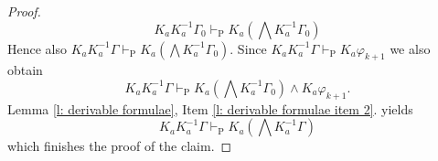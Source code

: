 \documentclass[10pt,a4paper]{amsart}
\newcommand{\K}{K}
\newcommand{\agi}{a}
\begin{document}
\begin{proof}
    \begin{equation*}
        \K_\agi \K_\agi^{-1} \Gamma_0 \vdash_\mathrm{P} \K_\agi (\bigwedge \K_\agi^{-1} \Gamma_0)
    \end{equation*}
    Hence also $\K_\agi \K_\agi^{-1} \Gamma \vdash_\mathrm{P} \K_\agi (\bigwedge \K_\agi^{-1} \Gamma_0)$. Since $\K_\agi \K_\agi^{-1} \Gamma \vdash_\mathrm{P} \K_\agi \varphi_{k+1}$ we also obtain
    \begin{equation*}
        \K_\agi \K_\agi^{-1} \Gamma \vdash_\mathrm{P} \K_\agi (\bigwedge \K_\agi^{-1} \Gamma_0) \wedge \K_\agi \varphi_{k+1}.
    \end{equation*}
     Lemma \ref{l: derivable formulae}, Item \ref{l: derivable formulae item 2}. yields
     \begin{equation*}
         \K_\agi \K_\agi^{-1} \Gamma \vdash_\mathrm{P} \K_\agi (\bigwedge \K_\agi^{-1} \Gamma)
     \end{equation*}
     which finishes the proof of the claim. \smallskip


\end{proof}
\end{document}
